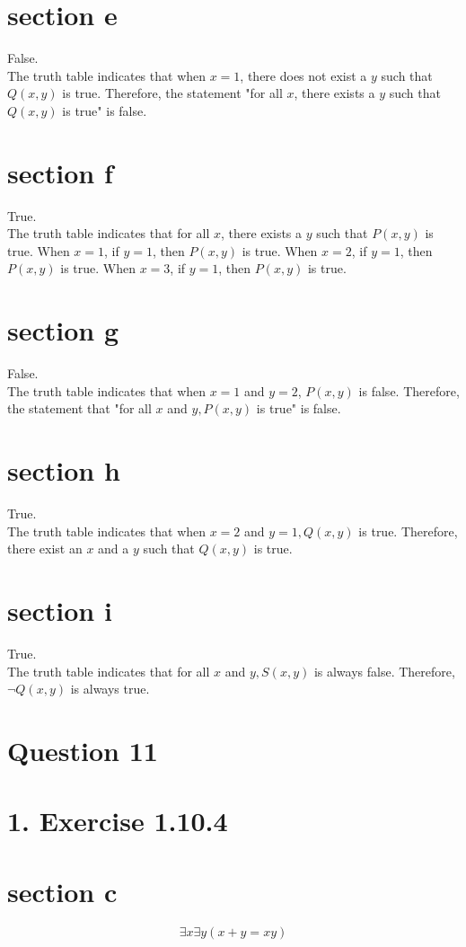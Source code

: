\documentclass[10pt]{article}
\begin{document}
\section*{section e}
False.\\
The truth table indicates that when $x=1$, there does not exist a $y$ such that $Q(x, y)$ is true. Therefore, the statement "for all $x$, there exists a $y$ such that $Q(x, y)$ is true" is false.

\section*{section f}
True.\\
The truth table indicates that for all $x$, there exists a $y$ such that $P(x, y)$ is true. When $x=1$, if $y=1$, then $P(x, y)$ is true. When $x=2$, if $y=1$, then $P(x, y)$ is true. When $x=3$, if $y=1$, then $P(x, y)$ is true.

\section*{section g}
False.\\
The truth table indicates that when $x=1$ and $y=2$, $P(x, y)$ is false. Therefore, the statement that "for all $x$ and $y, P(x, y)$ is true" is false.

\section*{section h}
True.\\
The truth table indicates that when $x=2$ and $y=1, Q(x, y)$ is true. Therefore, there exist an $x$ and a $y$ such that $Q(x, y)$ is true.

\section*{section i}
True.\\
The truth table indicates that for all $x$ and $y, S(x, y)$ is always false. Therefore, $\neg Q(x, y)$ is always true.

\pagebreak
\section*{Question 11}
\section*{1. Exercise 1.10.4}
\section*{section c}
$$
\exists x \exists y(x+y=x y)
$$
\end{document}
